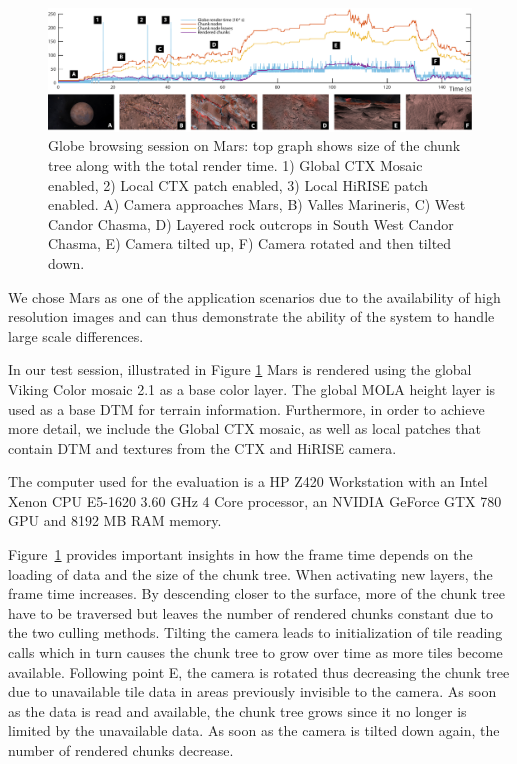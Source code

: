 \documentclass[journal]{vgtc}                %
\newcommand{\fig}[1]{Figure~\ref{fig:#1}}
\begin{document}
\begin{figure}
\includegraphics[width=\linewidth]{figures/marsbrowsing5_compressed.pdf}
\caption{Globe browsing session on Mars: top graph shows size of the chunk tree along with the total render time. 1) Global CTX Mosaic enabled, 2) Local CTX patch enabled, 3) Local HiRISE patch enabled. A) Camera approaches Mars, B) Valles Marineris, C) West Candor Chasma, D) Layered rock outcrops in South West Candor Chasma, E) Camera tilted up, F) Camera rotated and then tilted down.}  \vspace{-2mm}
\label{fig:globebrowsingmars}
\end{figure}

We chose Mars as one of the application scenarios due to the availability of high resolution images and can thus demonstrate the ability of the system to handle large scale differences.

In our test session, illustrated in Figure \ref{fig:globebrowsingmars} Mars is rendered using the global Viking Color mosaic 2.1 as a base color layer.
The global MOLA height layer is used as a base DTM for terrain information.
Furthermore, in order to achieve more detail, we include the Global CTX mosaic, as well as local patches that contain DTM and textures from the CTX and HiRISE camera.

The computer used for the evaluation is a HP Z420 Workstation with an Intel Xenon CPU E5-1620 3.60 GHz 4 Core processor, an NVIDIA GeForce GTX 780 GPU and 8192 MB RAM memory.

\fig{globebrowsingmars} provides important insights in how the frame time depends on the loading of data and the size of the chunk tree.
When activating new layers, the frame time increases.
By descending closer to the surface, more of the chunk tree have to be traversed but leaves the number of rendered chunks constant due to the two culling methods.
Tilting the camera leads to initialization of tile reading calls which in turn causes the chunk tree to grow over time as more tiles become available.
Following point E, the camera is rotated thus decreasing the chunk tree due to unavailable tile data in areas previously invisible to the camera.
As soon as the data is read and available, the chunk tree grows since it no longer is limited by the unavailable data.
As soon as the camera is tilted down again, the number of rendered chunks decrease.
\end{document}

